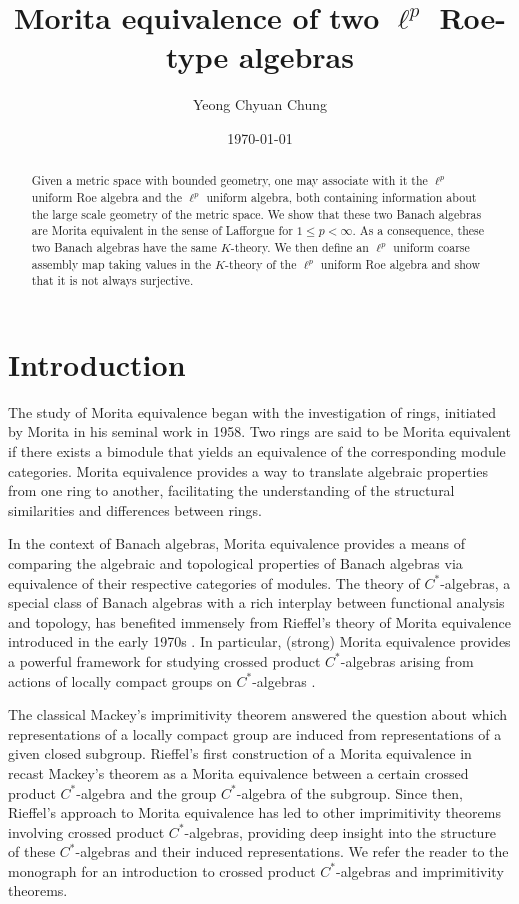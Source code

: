 \documentclass[a4,11pt]{amsart}
\theoremstyle{remark}
\begin{document}
\title{Morita equivalence of two $\ell^p$ Roe-type algebras}
\author{Yeong Chyuan Chung}
\date{\today}
\maketitle

\begin{abstract}
Given a metric space with bounded geometry, one may associate with it the $\ell^p$ uniform Roe algebra and the $\ell^p$ uniform algebra, both containing information about the large scale geometry of the metric space.
We show that these two Banach algebras are Morita equivalent in the sense of Lafforgue for $1\leq p<\infty$.
As a consequence, these two Banach algebras have the same $K$-theory.
We then define an $\ell^p$ uniform coarse assembly map taking values in the $K$-theory of the $\ell^p$ uniform Roe algebra and show that it is not always surjective.
\end{abstract}


\section{Introduction}

The study of Morita equivalence began with the investigation of rings, initiated by Morita in his seminal work \cite{Mor58} in 1958. Two rings are said to be Morita equivalent if there exists a bimodule that yields an equivalence of the corresponding module categories. Morita equivalence provides a way to translate algebraic properties from one ring to another, facilitating the understanding of the structural similarities and differences between rings.

In the context of Banach algebras, Morita equivalence provides a means of comparing the algebraic and topological properties of Banach algebras via equivalence of their respective categories of modules. 
The theory of $C^*$-algebras, a special class of Banach algebras with a rich interplay between functional analysis and topology, has benefited immensely from Rieffel's theory of Morita equivalence introduced in the early 1970s \cite{Rie74,Rie74a,Rie82}. In particular, (strong) Morita equivalence provides a powerful framework for studying crossed product $C^*$-algebras arising from actions of locally compact groups on $C^*$-algebras \cite{Rie76,Rie82a}.

The classical Mackey's imprimitivity theorem \cite[Theorem 2]{Mac49} answered the question about which representations of a locally compact group are induced from representations of a given closed subgroup. Rieffel's first construction of a Morita equivalence in \cite{Rie74} recast Mackey's theorem as a Morita equivalence between a certain crossed product $C^*$-algebra and the group $C^*$-algebra of the subgroup.
Since then, Rieffel's approach to Morita equivalence has led to other imprimitivity theorems involving crossed product $C^*$-algebras, providing deep insight into the structure of these $C^*$-algebras and their induced representations.
We refer the reader to the monograph \cite{Wil} for an introduction to crossed product $C^*$-algebras and imprimitivity theorems.
\end{document}
